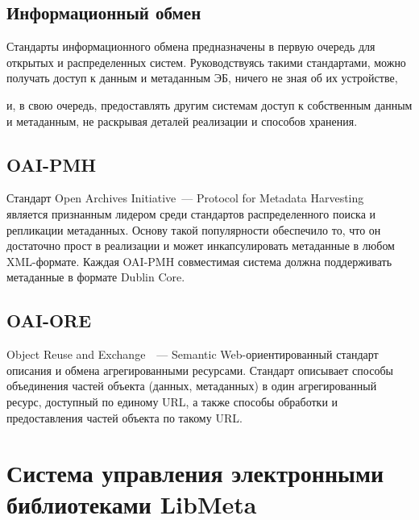 \begin{multicols}{2}
\vspace*{-6pt}

\subsection{Информационный обмен}
  
  Стандарты информационного обмена пред\-на\-зна\-че\-ны в первую очередь для открытых и 
рас\-пределен\-ных систем. Руководствуясь такими стандартами, можно получать доступ к 
данным и метадан\-ным ЭБ, ничего не зная об их устройстве,\linebreak\vspace*{-12pt}
\pagebreak

\noindent
 и, в свою очередь, предоставлять 
другим системам доступ к собственным данным и метаданным, не раскрывая деталей 
реализации и способов хранения.
  
\vspace*{-12pt}

  \subsection*{OAI-PMH}
  
  Стандарт Open Archives Initiative~--- Protocol for Metadata Harvesting~\cite{22ser} является 
признанным лидером среди стандартов распределенного поиска и репликации метаданных. 
Основу такой популярности обеспечило то, что он достаточно прост в реализации и может 
инкапсулировать метаданные в любом XML-формате. Каждая OAI-PMH со\-вмес\-ти\-мая 
система должна поддерживать метаданные в формате Dublin Core.
  
\vspace*{-12pt}

  \subsection*{OAI-ORE}
  
  Object Reuse and Exchange~\cite{23ser}~--- Semantic Web-ориентированный стандарт 
описания и обмена агрегированными ресурсами. Стандарт описывает способы объединения 
частей объекта (данных, метаданных) в один агрегированный ресурс, доступный по единому 
URL, а также способы обработки и предоставления частей объекта по такому URL.

\vspace*{-6pt}

\section{Система управления электронными библиотеками LibMeta}
  

\end{multicols}
